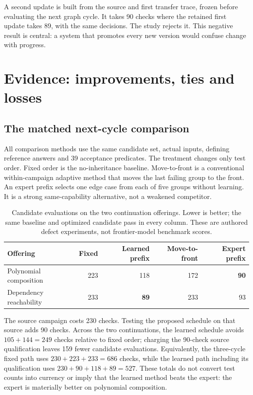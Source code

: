 \documentclass[11pt,letterpaper]{article}
\begin{document}
A second update is built from the source and first transfer trace, frozen before evaluating the next graph cycle. It takes 90 checks where the retained first update takes 89, with the same decisions. The study rejects it. This negative result is central: a system that promotes every new version would confuse change with progress.

\section{Evidence: improvements, ties and losses}
\subsection{The matched next-cycle comparison}
All comparison methods use the same candidate set, actual inputs, defining reference answers and 39 acceptance predicates. The treatment changes only test order. Fixed order is the no-inheritance baseline. Move-to-front is a conventional within-campaign adaptive method that moves the last failing group to the front. An expert prefix selects one edge case from each of five groups without learning. It is a strong same-capability alternative, not a weakened competitor.

\begin{table}[htbp]\centering\small
\caption{Candidate evaluations on the two continuation offerings. Lower is better; the same baseline and optimized candidate pass in every column. These are authored defect experiments, not frontier-model benchmark scores.}
\begin{tabularx}{\linewidth}{@{}Yrrrr@{}}\toprule
Offering & Fixed & Learned prefix & Move-to-front & Expert prefix\\\midrule
Polynomial composition & 223 & 118 & 172 & \textbf{90}\\
Dependency reachability & 233 & \textbf{89} & 233 & 93\\\bottomrule
\end{tabularx}
\label{tab:transfer}
\end{table}

The source campaign costs 230 checks. Testing the proposed schedule on that source adds 90 checks. Across the two continuations, the learned schedule avoids $105+144=249$ checks relative to fixed order; charging the 90-check source qualification leaves 159 fewer candidate evaluations. Equivalently, the three-cycle fixed path uses $230+223+233=686$ checks, while the learned path including its qualification uses $230+90+118+89=527$. These totals do not convert test counts into currency or imply that the learned method beats the expert: the expert is materially better on polynomial composition.
\end{document}
